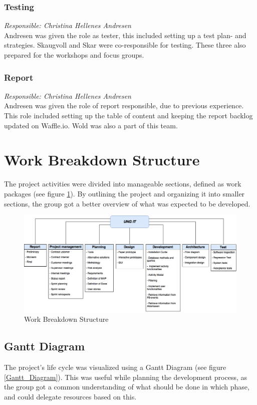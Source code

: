 \subsubsection{Testing}
\textit{Responsible: Christina Hellenes Andresen}\\
Andresen was given the role as tester, this included setting up a test plan- and strategies. Skaugvoll and Skar were co-responsible for testing. These three also prepared for the workshops and focus groups.

\subsubsection{Report}
\textit{Responsible: Christina Hellenes Andresen}\\
Andresen was given the role of report responsible, due to previous experience. This role included setting up the table of content and keeping the report backlog updated on Waffle.io. Wold was also a part of this team.

\section{Work Breakdown Structure}
The project activities were divided into manageable sections, defined as work packages (see figure \ref{Work_Breakdown_Structure}). By outlining the project and organizing it into smaller sections, the group got a better overview of what was expected to be developed.

\begin{figure}[ht]
\centering
    \includegraphics[width=1\textwidth]{fig/work_packages_new}
\caption{Work Breakdown Structure}
\label{Work_Breakdown_Structure}
\end{figure}

\subsection{Gantt Diagram} \label{GanttDiagram}
The project's life cycle was visualized using a Gantt Diagram (see figure \ref{Gantt_Diagram}). This was useful while planning the development process, as the group got a common understanding of what should be done in which phase, and could delegate resources based on this. 

